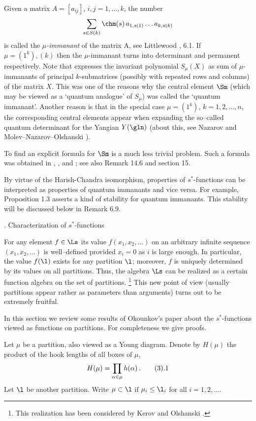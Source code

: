 Given a matrix $A=[a_{ij}]$, $i,j=1,\dots,k$,
the number
$$
\sum_{s\in S(k)} \chm(s) \, a_{1,s(1)} \dots a_{k,s(k)}
$$
is called the {\it $\mu$-immanant} of the matrix A, see Littlewood 
\cite{L}, 6.1.
If $\mu=(1^k),(k)$ then the $\mu$-immanant turns into
determinant and permanent respectively.
Note that  expresses the invariant polynomial $S_\mu(X)$ 
as sum of $\mu$-immanants of principal
$k$-submatrices (possibly 
with repeated rows and columns) of the matrix $X$. This
was one of the reasons why the central element $\Sm$ (which may be viewed as
a `quantum analogue' of $S_\mu$) was called the `quantum immanant'.
Another reason is that in the special case $\mu=(1^k)$, $k=1,2,\ldots,n$,
the corresponding central elements appear when expanding the
so--called quantum determinant for the Yangian $Y(\gln)$ (about this, see 
Nazarov \cite{N1} and Molev--Nazarov--Olshanski \cite{MNO}).
\endexample

To find an explicit formula for $\Sm$ is a much less trivial problem.
Such a formula was obtained in \cite{Ok1}, \cite{N2}, and \cite{Ok2}; 
see also Remark 14.6 and section 15.

By virtue of the Harish-Chandra isomorphism, properties
of $s^*$-functions can be interpreted as properties of 
quantum immanants and vice versa. For example, Proposition 1.3 
asserts a kind of stability for quantum
immanants. This stability will be discussed below in
Remark 6.9. 


. Characterization of $s^*$-functions \endhead

For any element $f\in\Ls$ its value $f(x_1,x_2,\ldots)$ on an arbitrary 
infinite
sequence $(x_1,x_2,\ldots)$ is well--defined provided  $x_i=0$
as $i$ is large enough. In particular, the value $f(\l)$ exists for any
partition $\l$; moreover, $f$ is uniquely determined by its values on all
partitions. Thus, the algebra $\Ls$ can be realized as a certain function
algebra on the set of partitions. 
\footnote{ This realization has been considered by Kerov and Olshanski
\cite{KO}.}
This new point of view (usually
partitions appear rather as parameters than arguments) turns out to be
extremely fruitful.

In this section we review some results of Okounkov's paper \cite{Ok1} 
about the $s^*$-functions viewed as functions on partitions. For
completeness we give proofs. 

Let $\mu$ be a partition, also viewed as a
Young diagram.
Denote by $H(\mu)$ the product of the hook lengths of
all boxes of $\mu$,
$$
H(\mu)=\prod_{\alpha\in\mu} h(\alpha) \,.\tag3.1
$$
Let $\l$ be another partition. Write
$\mu\subset\l$ if $\mu_i\le\l_i$ for all $i=1,2,\dots$. 

